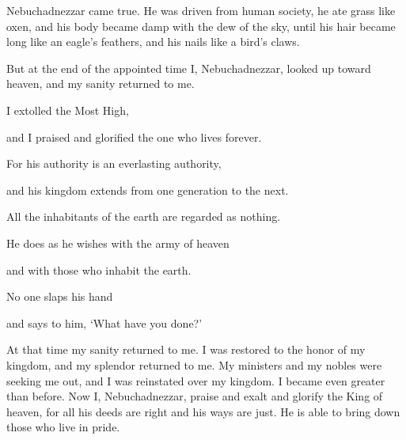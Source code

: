 {Nebuchadnezzar
came true.
He was driven
from
human society,
he ate
grass
like oxen,
and his body
became damp
with the dew
of the sky,
until
his hair
became long like
an eagle’s
feathers, and his nails
like a bird’s claws.
\par }{\PP {}But at the end
of the appointed time
I,
Nebuchadnezzar,
looked up
toward heaven,
and my sanity
returned
to
me.
\par }{\Q I extolled
the Most High,
\par }{\Q and I praised
and glorified
the one who lives
forever.
\par }{\Q For his authority
is an everlasting
authority,
\par }{\Q and his kingdom
extends from
one generation
to the next.
\par }{\Q {}All
the inhabitants
of the earth
are regarded
as nothing.
\par }{\Q He does
as he wishes
with the army
of heaven
\par }{\Q and with those who
inhabit
the earth.
\par }{\Q No one
slaps
his hand
\par }{\Q and says
to him, ‘What
have you done?’
\par }{\PP {}At that time
my sanity
returned
to me.
I was restored to the honor
of my kingdom, and my splendor
returned
to me.
My ministers
and my nobles
were seeking
me out,
and I was reinstated
over my kingdom.
I became even greater
than before.
Now
I,
Nebuchadnezzar,
praise
and exalt
and glorify
the King
of heaven,
for all
his deeds
are right
and his ways
are just.
He is able
to bring down
those who
live
in pride.

}
